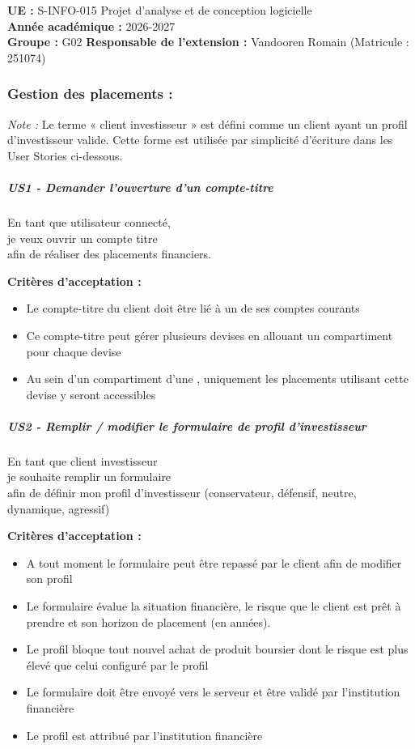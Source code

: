 \textbf{UE :} S-INFO-015 Projet d'analyse et de conception logicielle\\
\textbf{Année académique :} 2026-2027\\
\textbf{Groupe :} G02 \textbf{Responsable de l'extension :} Vandooren
Romain (Matricule : 251074)

\subsubsection{Gestion des placements :}\label{gestion-des-placements}

\emph{Note :} Le terme « client investisseur » est défini comme un
client ayant un profil d'investisseur valide. Cette forme est utilisée
par simplicité d'écriture dans les User Stories ci-dessous.

\subparagraph{US1 - Demander l'ouverture d'un
compte-titre}\label{us1---demander-louverture-dun-compte-titre}

En tant que utilisateur connecté,\\
je veux ouvrir un compte titre\\
afin de réaliser des placements financiers.

\textbf{Critères d'acceptation :}

\begin{itemize}
\tightlist
\item
  Le compte-titre du client doit être lié à un de ses comptes courants
\item
  Ce compte-titre peut gérer plusieurs devises en allouant un
  compartiment pour chaque devise
\item
  Au sein d'un compartiment d'une , uniquement les placements utilisant
  cette devise y seront accessibles
\end{itemize}

\subparagraph{US2 - Remplir / modifier le formulaire de profil
d'investisseur}\label{us2---remplir-modifier-le-formulaire-de-profil-dinvestisseur}

En tant que client investisseur\\
je souhaite remplir un formulaire\\
afin de définir mon profil d'investisseur (conservateur, défensif,
neutre, dynamique, agressif)

\textbf{Critères d'acceptation :}

\begin{itemize}
\tightlist
\item
  A tout moment le formulaire peut être repassé par le client afin de
  modifier son profil
\item
  Le formulaire évalue la situation financière, le risque que le client
  est prêt à prendre et son horizon de placement (en années).
\item
  Le profil bloque tout nouvel achat de produit boursier dont le risque
  est plus élevé que celui configuré par le profil
\item
  Le formulaire doit être envoyé vers le serveur et être validé par
  l'institution financière
\item
  Le profil est attribué par l'institution financière
\end{itemize}

